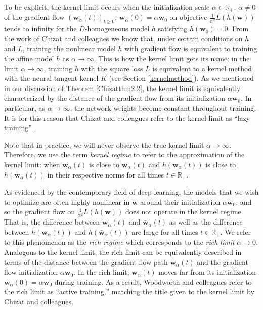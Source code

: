 \documentclass{article}
\begin{document}
To be explicit, the kernel limit occurs when the initialization scale $\alpha \in \mathbb{R}_+$, $\alpha \neq 0$ of the gradient flow $(\boldsymbol{w}_{\alpha}(t))_{t \geq 0}$, $\boldsymbol{w}_{\alpha}(0) = \alpha \boldsymbol{w}_0$ on objective $\frac{1}{\alpha^2}L(h(\boldsymbol{w}))$ tends to infinity for the $D$-homogeneous model $h$ satisfying $h(\boldsymbol{w}_0) = 0$. From the work of Chizat and colleagues we know that, under certain conditions on $h$ and $L$, training the nonlinear model $h$ with gradient flow is equivalent to training the affine model $\bar{h}$ as $\alpha \rightarrow \infty$. This is how the kernel limit gets its name: in the limit $\alpha \rightarrow \infty$, training $h$ with the square loss $L$ is equivalent to a kernel method with the neural tangent kernel $K$ (see Section \ref{kernelmethod}). As we mentioned in our discussion of Theorem \ref{Chizatthm2.2}, the kernel limit is equivalently characterized by the distance of the gradient flow from its initialization $\alpha \boldsymbol{w}_0$. In particular, as $\alpha \rightarrow \infty$, the network weights become constant throughout training. It is for this reason that Chizat and colleagues refer to the kernel limit as \enquote{lazy training} \cite{chizat2018lazy}. 

Note that in practice, we will never observe the true kernel limit $\alpha \rightarrow \infty$. Therefore, we use the term \textit{kernel regime} to refer to the approximation of the kernel limit: when $\boldsymbol{w}_{\alpha}(t)$ is close to $\boldsymbol{\bar{w}}_{\alpha}(t)$ and $h(\boldsymbol{w}_{\alpha}(t))$ is close to $h(\boldsymbol{\bar{w}}_{\alpha}(t))$ in their respective norms for all times $t \in \mathbb{R}_+$.

As evidenced by the contemporary field of deep learning, the models that we wish to optimize are often highly nonlinear in $\boldsymbol{w}$ around their initialization $\alpha\boldsymbol{w}_0$, and so the gradient flow on $\frac{1}{\alpha^2}L(h(\boldsymbol{w}))$ does not operate in the kernel regime. That is, the difference between $\boldsymbol{w}_{\alpha}(t)$ and $\boldsymbol{\bar{w}}_{\alpha}(t)$ as well as the difference between $h(\boldsymbol{w}_{\alpha}(t))$ and $h(\boldsymbol{\bar{w}}_{\alpha}(t))$ are large for all times $t \in \mathbb{R}_+$. We refer to this phenomenon as the \textit{rich regime} which corresponds to the \textit{rich limit} $\alpha \rightarrow 0$. Analogous to the kernel limit, the rich limit can be equivalently described in terms of the distance between the gradient flow path $\boldsymbol{w}_{\alpha}(t)$ and the gradient flow initialization $\alpha\boldsymbol{w}_0$. In the rich limit, $\boldsymbol{w}_{\alpha}(t)$ moves far from its initialization $\boldsymbol{w}_{\alpha}(0) = \alpha \boldsymbol{w}_0$ during training. As a result, Woodworth and colleagues refer to the rich limit as \enquote{active training,} matching the title given to the kernel limit by Chizat and colleagues.
\end{document}
